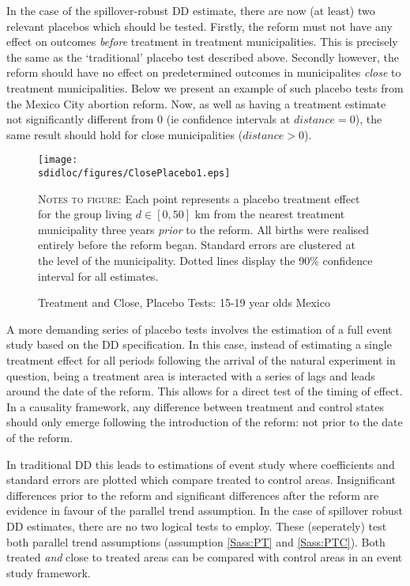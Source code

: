 In the case of the spillover-robust DD estimate, there are now (at least) two
relevant placebos which should be tested.  Firstly, the reform must not have any
effect on outcomes \emph{before} treatment in treatment municipalities.  This is
precisely the same as the `traditional' placebo test described above.  Secondly
however, the reform should have no effect on predetermined outcomes in 
municipalites \emph{close} to treatment municipalities.  Below we present an 
example of such placebo tests from the Mexico City abortion reform.  Now, as well
as having a treatment estimate not significantly different from 0 (ie confidence 
intervals at $distance=0$), the same result should hold for close municipalities 
($distance>0$).
\begin{figure}[h!]
\texttt{[image: \\sdidloc/figures/ClosePlacebo1.eps]}
\caption{Treatment and Close, Placebo Tests: 15-19 year olds Mexico}
\label{SFig:MexClose}
\vspace{2mm}
\begin{footnotesize}
\textsc{Notes to figure}: Each point represents a placebo treatment effect for the 
group living $d\in [0,50]$ km from the nearest treatment municipality three years
\emph{prior} to the reform.  All births were realised entirely before the reform
began.  Standard errors are clustered at the level of the municipality.  Dotted 
lines display the 90\% confidence interval for all estimates.
\end{footnotesize}
\end{figure}

A more demanding series of placebo tests involves the estimation of a full event
study based on the DD specification. In this case, instead of estimating a single
treatment effect for all periods following the arrival of the natural experiment
in question, being a treatment area is interacted with a series of lags and leads
around the date of the reform.  This allows for a direct test of the timing of
effect.  In a \citet{Granger1969} causality framework, any difference between 
treatment and control states should only emerge following the introduction of the
reform: not prior to the date of the reform.  

In traditional DD this leads to estimations of event study where coefficients
and standard errors are plotted which compare treated to control areas.  
Insignificant differences prior to the reform and significant differences after
the reform are evidence in favour of the parallel trend assumption.  In the case
of spillover robust DD estimates, there are no two logical tests to employ.  
These (seperately) test both parallel trend assumptions (assumption \ref{Sass:PT}
and \ref{Sass:PTC}).  Both treated \emph{and} close to treated areas can be 
compared with control areas in an event study framework.  

